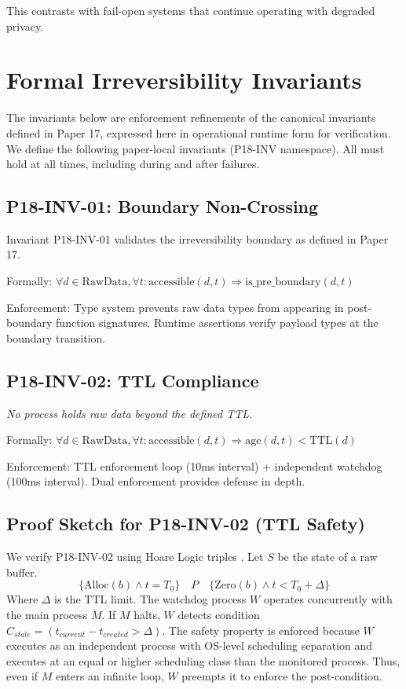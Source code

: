 \documentclass[conference]{IEEEtran}
\begin{document}
This contrasts with fail-open systems that continue operating with degraded privacy.

\section{Formal Irreversibility Invariants}
The invariants below are enforcement refinements of the canonical invariants defined in Paper 17, expressed here in operational runtime form for verification. We define the following paper-local invariants (P18-INV namespace). All must hold at all times, including during and after failures.

\subsection{P18-INV-01: Boundary Non-Crossing}
Invariant P18-INV-01 validates the irreversibility boundary as defined in Paper 17.

Formally: $\forall d \in \text{RawData}, \forall t: \text{accessible}(d, t) \Rightarrow \text{is\_pre\_boundary}(d, t)$

Enforcement: Type system prevents raw data types from appearing in post-boundary function signatures. Runtime assertions verify payload types at the boundary transition.

\subsection{P18-INV-02: TTL Compliance}
\textit{No process holds raw data beyond the defined TTL.}

Formally: $\forall d \in \text{RawData}, \forall t: \text{accessible}(d, t) \Rightarrow \text{age}(d, t) < \text{TTL}(d)$

Enforcement: TTL enforcement loop (10ms interval) + independent watchdog (100ms interval). Dual enforcement provides defense in depth.

\subsection{Proof Sketch for P18-INV-02 (TTL Safety)}
We verify P18-INV-02 using Hoare Logic triples \cite{b19}. Let $S$ be the state of a raw buffer.
\begin{equation}
\{ \text{Alloc}(b) \land t = T_0 \} \quad P \quad \{ \text{Zero}(b) \land t < T_0 + \Delta \}
\end{equation}
Where $\Delta$ is the TTL limit.
The watchdog process $W$ operates concurrently with the main process $M$.
If $M$ halts, $W$ detects condition $C_{stale} = (t_{current} - t_{created} > \Delta)$.
The safety property is enforced because $W$ executes as an independent process with OS-level scheduling separation and executes at an equal or higher scheduling class than the monitored process. Thus, even if $M$ enters an infinite loop, $W$ preempts it to enforce the post-condition.
\end{document}
